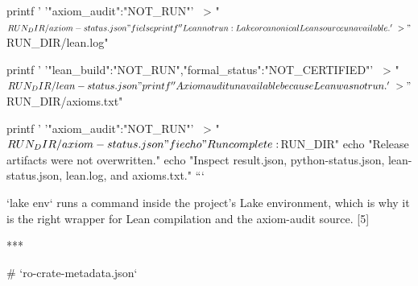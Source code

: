     printf '%
      '{"axiom_audit":"NOT_RUN"}' \
      > "$RUN_DIR/axiom-status.json"
  fi
else
  printf '%
    'Lean not run: Lake or canonical Lean source unavailable.' \
    > "$RUN_DIR/lean.log"

  printf '%
    '{"lean_build":"NOT_RUN","formal_status":"NOT_CERTIFIED"}' \
    > "$RUN_DIR/lean-status.json"

  printf '%
    'Axiom audit unavailable because Lean was not run.' \
    > "$RUN_DIR/axioms.txt"

  printf '%
    '{"axiom_audit":"NOT_RUN"}' \
    > "$RUN_DIR/axiom-status.json"
fi

echo "Run complete: $RUN_DIR"
echo "Release artifacts were not overwritten."
echo "Inspect result.json, python-status.json, lean-status.json, lean.log, and axioms.txt."
```

`lake env` runs a command inside the project’s Lake environment, which is why it is the right wrapper for Lean compilation and the axiom-audit source. [5]

***

# `ro-crate-metadata.json`

